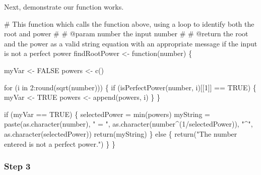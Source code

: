 \documentclass[
  letterpaper,
  DIV=11,
  numbers=noendperiod]{scrartcl}
\newenvironment{Shaded}{\begin{snugshade}}{\end{snugshade}}
\newcommand{\CommentTok}[1]{\textcolor[rgb]{0.37,0.37,0.37}{#1}}
\newcommand{\ConstantTok}[1]{\textcolor[rgb]{0.56,0.35,0.01}{#1}}
\newcommand{\ControlFlowTok}[1]{\textcolor[rgb]{0.00,0.23,0.31}{#1}}
\newcommand{\DecValTok}[1]{\textcolor[rgb]{0.68,0.00,0.00}{#1}}
\newcommand{\FunctionTok}[1]{\textcolor[rgb]{0.28,0.35,0.67}{#1}}
\newcommand{\NormalTok}[1]{\textcolor[rgb]{0.00,0.23,0.31}{#1}}
\newcommand{\OtherTok}[1]{\textcolor[rgb]{0.00,0.23,0.31}{#1}}
\newcommand{\SpecialCharTok}[1]{\textcolor[rgb]{0.37,0.37,0.37}{#1}}
\newcommand{\StringTok}[1]{\textcolor[rgb]{0.13,0.47,0.30}{#1}}
\begin{document}
Next, demonstrate our function works.

\begin{Shaded}
\begin{Highlighting}[]
\CommentTok{\#\textquotesingle{} This function which calls the function above, using a loop to identify both the root and power}
\CommentTok{\#\textquotesingle{} }
\CommentTok{\#\textquotesingle{} @param number the input number}
\CommentTok{\#\textquotesingle{} }
\CommentTok{\#\textquotesingle{} @return the root and the power as a valid string equation with an appropriate message if the input is not a perfect power}
\NormalTok{findRootPower }\OtherTok{\textless{}{-}} \ControlFlowTok{function}\NormalTok{(number) \{}
  
\NormalTok{  myVar }\OtherTok{\textless{}{-}} \ConstantTok{FALSE}
\NormalTok{  powers }\OtherTok{\textless{}{-}} \FunctionTok{c}\NormalTok{()}
  
  \ControlFlowTok{for}\NormalTok{ (i }\ControlFlowTok{in} \DecValTok{2}\SpecialCharTok{:}\FunctionTok{round}\NormalTok{(}\FunctionTok{sqrt}\NormalTok{(number))) \{}
    \ControlFlowTok{if}\NormalTok{ (}\FunctionTok{isPerfectPower}\NormalTok{(number, i)[[}\DecValTok{1}\NormalTok{]] }\SpecialCharTok{==} \ConstantTok{TRUE}\NormalTok{) \{}
\NormalTok{      myVar }\OtherTok{\textless{}{-}} \ConstantTok{TRUE}
\NormalTok{      powers }\OtherTok{\textless{}{-}} \FunctionTok{append}\NormalTok{(powers, i)}
\NormalTok{    \}}
\NormalTok{  \}}
  
  \ControlFlowTok{if}\NormalTok{ (myVar }\SpecialCharTok{==} \ConstantTok{TRUE}\NormalTok{) \{}
\NormalTok{    selectedPower }\OtherTok{=} \FunctionTok{min}\NormalTok{(powers)}
\NormalTok{    myString }\OtherTok{=} \FunctionTok{paste}\NormalTok{(}\FunctionTok{as.character}\NormalTok{(number), }
                     \StringTok{" = "}\NormalTok{,}
                     \FunctionTok{as.character}\NormalTok{(number}\SpecialCharTok{\^{}}\NormalTok{(}\DecValTok{1}\SpecialCharTok{/}\NormalTok{selectedPower)),}
                     \StringTok{"\^{}"}\NormalTok{, }
                     \FunctionTok{as.character}\NormalTok{(selectedPower))}
    \FunctionTok{return}\NormalTok{(myString)}
\NormalTok{  \}}
  \ControlFlowTok{else}\NormalTok{ \{}
    \FunctionTok{return}\NormalTok{(}\StringTok{"The number entered is not a perfect power."}\NormalTok{)}
\NormalTok{  \}}
\NormalTok{\}}
\end{Highlighting}
\end{Shaded}

\hypertarget{step-3-1}{%
\subsubsection{Step 3}\label{step-3-1}}
\end{document}
